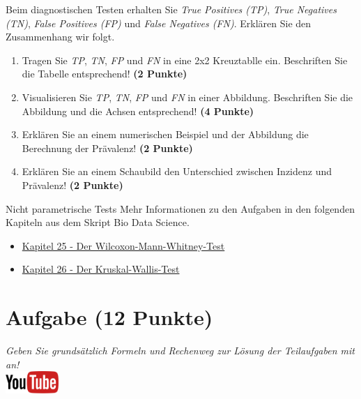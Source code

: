 \documentclass[a4paper, 9pt]{scrartcl}\usepackage[]{graphicx}\usepackage[]{xcolor}
\begin{document}
Beim diagnostischen Testen erhalten Sie \textit{True Positives (TP)},
\textit{True Negatives (TN)}, \textit{False Positives (FP)} und
\textit{False Negatives (FN)}. Erkl{\"a}ren Sie den Zusammenhang wir folgt.

\begin{enumerate}
\item Tragen Sie \textit{TP}, \textit{TN}, \textit{FP} und \textit{FN} in
  eine 2x2 Kreuztablle ein. Beschriften Sie die Tabelle entsprechend!
  \textbf{(2 Punkte)}
\item Visualisieren Sie \textit{TP}, \textit{TN}, \textit{FP} und
  \textit{FN} in einer Abbildung. Beschriften Sie die Abbildung und die
  Achsen entsprechend! \textbf{(4 Punkte)}
\item Erkl{\"a}ren Sie an einem numerischen Beispiel und der Abbildung die
  Berechnung der Pr{\"a}valenz!  \textbf{(2 Punkte)}
\item Erkl{\"a}ren Sie an einem Schaubild den Unterschied zwischen Inzidenz und
  Pr{\"a}valenz!  \textbf{(2 Punkte)}
\end{enumerate}





 
\clearpage
\begin{graybox}{Nicht parametrische Tests}
Mehr Informationen zu den Aufgaben in den folgenden Kapiteln aus dem Skript Bio Data Science.
  \begin{itemize}
  \item \href{https://jkruppa.github.io/stat-tests-utest.html}{Kapitel 25 - Der Wilcoxon-Mann-Whitney-Test}
  \item \href{https://jkruppa.github.io/stat-tests-kruskal.html}{Kapitel 26 - Der Kruskal-Wallis-Test}
  \end{itemize}
\end{graybox}
\clearpage

\section{Aufgabe \hfill (12 Punkte)}

\textit{Geben Sie grunds{\"a}tzlich Formeln und Rechenweg zur L{\"o}sung der
  Teilaufgaben mit an!} \\[1Ex]

\hfill\href{https://youtu.be/ArHA6MZOEOw}{\includegraphics[width =
  2cm]{img/youtube}} %
\hspace{2Ex}
\end{document}
